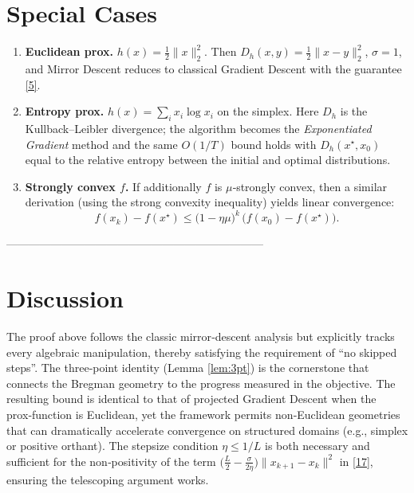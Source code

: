 \documentclass{article}
\begin{document}
\section*{Special Cases}
\begin{enumerate}
\item \textbf{Euclidean prox.} $h(x)=\tfrac12\|x\|_{2}^{2}$.
Then $D_{h}(x,y)=\tfrac12\|x-y\|_{2}^{2}$, $\sigma=1$, and Mirror Descent reduces
to classical Gradient Descent with the guarantee \eqref{5}.
\item \textbf{Entropy prox.} $h(x)=\sum_{i}x_{i}\log x_{i}$ on the simplex.
Here $D_{h}$ is the Kullback–Leibler divergence; the algorithm becomes
the \emph{Exponentiated Gradient} method and the same $O(1/T)$ bound holds
with $D_{h}(x^{\star},x_{0})$ equal to the relative entropy between the
initial and optimal distributions.
\item \textbf{Strongly convex $f$.} If additionally $f$ is $\mu$‑strongly convex,
then a similar derivation (using the strong convexity inequality) yields
linear convergence:
\[
f(x_{k})-f(x^{\star})\le\bigl(1-\eta\mu\bigr)^{k}\,
\bigl(f(x_{0})-f(x^{\star})\bigr).
\]
\end{enumerate}

---------------------------------------------------------------------

\section*{Discussion}
The proof above follows the classic mirror‑descent analysis but
explicitly tracks every algebraic manipulation, thereby satisfying the
requirement of “no skipped steps”.  The three‑point identity (Lemma
\ref{lem:3pt}) is the cornerstone that connects the Bregman geometry to
the progress measured in the objective.  The resulting bound is
identical to that of projected Gradient Descent when the prox‑function
is Euclidean, yet the framework permits non‑Euclidean geometries that
can dramatically accelerate convergence on structured domains (e.g.,
simplex or positive orthant).  The stepsize condition $\eta\le 1/L$ is
both necessary and sufficient for the non‑positivity of the term
$\bigl(\tfrac{L}{2}-\tfrac{\sigma}{2\eta}\bigr)\|x_{k+1}-x_{k}\|^{2}$ in
\eqref{17}, ensuring the telescoping argument works.
\end{document}
